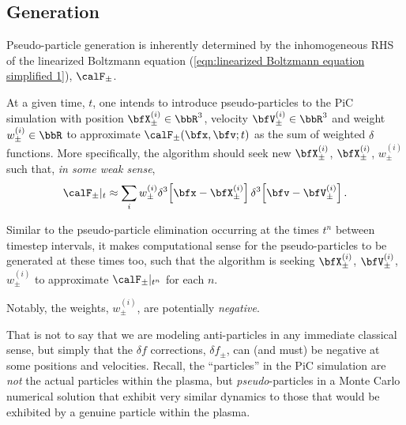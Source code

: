 \subsection*{Generation}
    Pseudo-particle generation is inherently determined by the inhomogeneous RHS of the linearized Boltzmann equation (\ref{eqn:linearized Boltzmann equation simplified 1}), $\calF_{\pm}$.
    
    At a given time, $t$, one intends to introduce pseudo-particles to the PiC simulation with position $\bfX_{\pm}^{(i)} \in \bbR^{3}$, velocity $\bfV_{\pm}^{(i)} \in \bbR^{3}$ and weight $w_{\pm}^{(i)} \in \bbR$ to approximate $\calF_{\pm}(\bfx, \bfv; t)$ as the sum of weighted $\delta$ functions. More specifically, the algorithm should seek new $\bfX_{\pm}^{(i)}$, $\bfX_{\pm}^{(i)}$, $w_{\pm}^{(i)}$ such that, \emph{in some weak sense},
    \begin{equation}\label{eqn:particle generation approximation}
        \calF_{\pm}|_{t}  \approx  \sum_{i}w_{\pm}^{(i)}\delta^{3}\!\left[\bfx - \bfX_{\pm}^{(i)}\right]\delta^{3}\!\left[\bfv - \bfV_{\pm}^{(i)}\right].
    \end{equation}

    Similar to the pseudo-particle elimination occurring at the times $t^{n}$ between timestep intervals, it makes computational sense for the pseudo-particles to be generated at these times too, such that the algorithm is seeking $\bfX_{\pm}^{(i)}$, $\bfV_{\pm}^{(i)}$, $w_{\pm}^{(i)}$ to approximate $\calF_{\pm}|_{t^{n}}$ for each $n$.

    \shortline

    \begin{remark}
        Notably, the weights, $w_{\pm}^{(i)}$, are potentially \emph{negative}.
        
        That is not to say that we are modeling anti-particles in any immediate classical sense, but simply that the $\delta\!f$ corrections, $\delta\!f_{\pm}$, can (and must) be negative at some positions and velocities. Recall, the ``particles'' in the PiC simulation are \emph{not} the actual particles within the plasma, but \emph{pseudo}-particles in a Monte Carlo numerical solution that exhibit very similar dynamics to those that would be exhibited by a genuine particle within the plasma.
    \end{remark}

